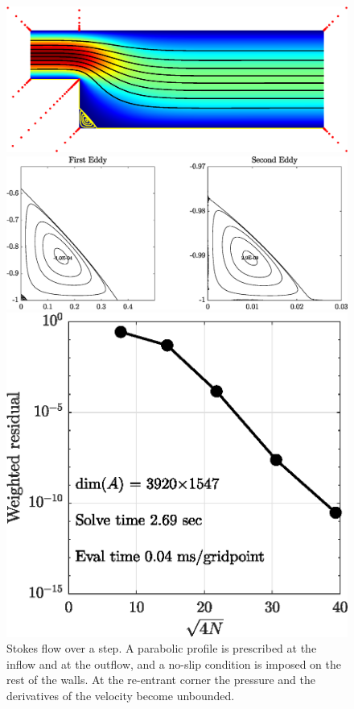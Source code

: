 \begin{figure}[H]
	\centering
	\includegraphics[width=\linewidth]{Figures/step}
	
	\vspace{2em}
	\includegraphics[width=\linewidth]{Figures/step_eddy}
	
	\vspace{2em}
	\includegraphics[width=0.5\linewidth]{Figures/step_conv}

	\caption{Stokes flow over a step. A parabolic profile is prescribed at the inflow and at the outflow, and a no-slip condition is imposed on the rest of the walls. At the re-entrant corner the pressure and the derivatives of the velocity become unbounded.}
	\label{fig:step}
\end{figure} 

